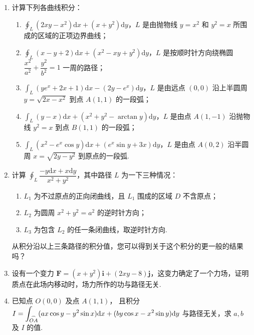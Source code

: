 \begin{enumerate}\setlength{\itemsep}{7pt}
    \item 计算下列各曲线积分：
    \begin{enumerate}[(1)]\setlength{\itemsep}{5pt}\setlength{\topsep}{15pt}
        \item $\displaystyle\oint_{L}(2xy-x^2)\text{d}x+(x+y^2)\text{d}y$，$L$ 是由抛物线 $y=x^2$ 和 $y^2=x$ 所围成的区域的正项边界曲线；
        \item $\displaystyle\oint_{L}(x-y+2)\text{d}x+(x^2-xy+y^2)\text{d}y$，$L$ 是按顺时针方向绕椭圆 $\dfrac{x^2}{a^2}+\dfrac{y^2}{b^2}=1$ 一周的路径；
        \item $\displaystyle\int_{L}(ye^x+2x+1)\text{d}x-(2y-e^x)\text{d}y$，$L$ 是由远点 $(0, 0)$ 沿上半圆周 $y=\sqrt{2x-x^2}$ 到点 $A(1, 1)$ 的一段弧；
        \item $\displaystyle\int_{L}(y-x)\text{d}x+(x^2+y^2-\arctan y)\text{d}y$，$L$ 是由点 $A(1, -1)$ 沿抛物线 $y^2=x$ 到点 $B(1, 1)$ 的一段弧；
        \item $\displaystyle\int_{L}(x^2-e^x\cos y)\text{d}x+(e^x\sin y+3x)\text{d}y$，$L$ 是由点 $A(0, 2)$ 沿半圆周 $x=\sqrt{2y-y^2}$ 到原点的一段弧.
    \end{enumerate}

    \item 计算 $\displaystyle\oint_{L}\dfrac{-y\text{d}x+x\text{d}y}{x^2+y^2}$，其中路径 $L$ 为一下三种情况：
    \begin{enumerate}[(1)]\setlength{\itemsep}{5pt}\setlength{\topsep}{15pt}
        \item $L_1$ 为不过原点的正向闭曲线，且 $L_1$ 围成的区域 $D$ 不含原点；
        \item $L_2$ 为圆周 $x^2+y^2=a^2$ 的逆时针方向；
        \item $L_3$ 为包含 $L_2$ 的任一条闭曲线，取逆时针方向.
    \end{enumerate}
    从积分沿以上三条路径的积分值，您可以得到关于这个积分的更一般的结果吗？

    \item 设有一个变力 $\boldsymbol{F}=(x+y^2)\boldsymbol{i}+(2xy-8)\boldsymbol{j}$，这变力确定了一个力场，证明质点在此场内移动时，场力所作的功与路径无关.
    
    \item 已知点 $O(0, 0)$ 及点 $A(1, 1)$，
    且积分 $\displaystyle I=\int_{\overset{\large{\frown}}{OA}}(ax\cos y-y^2\sin x)\text{d}x+(by\cos x-x^2\sin y)\text{d}y$ 与路径无关，求 $a, b$ 及 $I$ 的值.
    

\end{enumerate}
